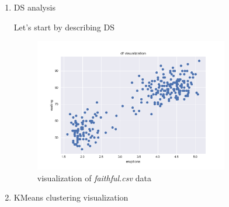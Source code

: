 \documentclass{homework}
\begin{document}
\begin{enumerate}[label=(\alph*)]
	\item DS analysis
		
		Let's start by describing DS

		
		\begin{figure}[h]
			\centering
			\includegraphics[width=0.8\textwidth]{df_visualization.png}
			\caption{visualization of \emph{faithful.csv} data}
		\end{figure}
	\item KMeans clustering visualization


\end{enumerate}
\end{document}
